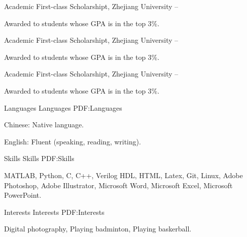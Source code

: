 \documentclass[letterpaper,MMMyyyy,nonstopmode]{simpleresumecv}
\begin{document}
\begin{Body}
\BulletItem
Academic First-class Scholarshipt,
Zhejiang University
\hfill
{} --
\begin{Detail}
	\Item
	Awarded to students whose GPA is in the top 3\%.
\end{Detail}

\BulletItem
Academic First-class Scholarshipt,
Zhejiang University
\hfill
{} --
\begin{Detail}
	\Item
	Awarded to students whose GPA is in the top 3\%.
\end{Detail}

\BulletItem
Academic First-class Scholarshipt,
Zhejiang University
\hfill
{} --
\begin{Detail}
	\Item
	Awarded to students whose GPA is in the top 3\%.
\end{Detail}


\Section
{Languages}
{Languages}
{PDF:Languages}

\BulletItem
Chinese: Native language.

\BulletItem
English: Fluent (speaking, reading, writing).


\Section
{Skills}
{Skills}
{PDF:Skills}

\Entry
MATLAB,
Python,
C,
C++,
Verilog HDL,
HTML,
Latex,
Git,
Linux,
Adobe Photoshop,
Adobe Illustrator,
Microsoft Word,
Microsoft Excel,
Microsoft PowerPoint.

\Section
{Interests}
{Interests}
{PDF:Interests}

\Entry
Digital photography,
Playing badminton,
Playing baskerball.

\end{Body}
\end{document}
